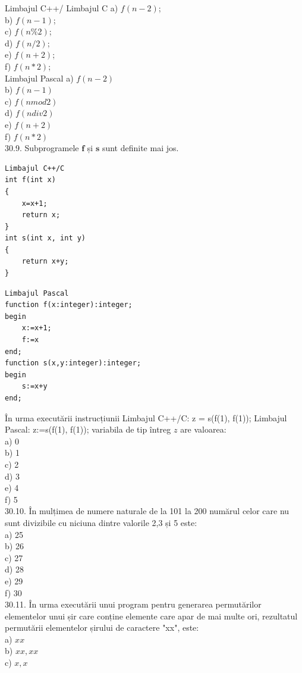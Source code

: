\begin{itemize}
Limbajul C++/ Limbajul C
a) $f(n-2)$;
\\
b) $f(n-1)$;
\\
c) $f(n \% 2)$;
\\
d) $f(n / 2)$;
\\
e) $f(n+2)$;
\\
f) $f(n * 2)$;
\\
Limbajul Pascal
a) $f(n-2)$
\\
b) $f(n-1)$
\\
c) $f(n mod 2)$
\\
d) $f(n div 2)$
\\
e) $f(n+2)$
\\
f) $f(n * 2)$
\\
30.9. Subprogramele $\mathbf{f}$ și $\mathbf{s}$ sunt definite mai jos.
\begin{verbatim}
Limbajul C++/C
int f(int x)
{
    x=x+1;
    return x;
}
int s(int x, int y)
{
    return x+y;
}
\end{verbatim}
\begin{verbatim}
Limbajul Pascal
function f(x:integer):integer;
begin
    x:=x+1;
    f:=x
end;
function s(x,y:integer):integer;
begin
    s:=x+y
end;
\end{verbatim}
În urma executării instrucțiunii
Limbajul C++/C: z = s(f(1), f(1));
Limbajul Pascal: z:=s(f(1), f(1));
variabila de tip întreg $z$ are valoarea:
\\
a) 0
\\
b) 1
\\
c) 2
\\
d) 3
\\
e) 4
\\
f) 5
\\
30.10. În mulțimea de numere naturale de la 101 la 200 numărul celor care nu sunt divizibile cu niciuna dintre valorile 2,3 și 5 este:
\\
a) 25
\\
b) 26
\\
c) 27
\\
d) 28
\\
e) 29
\\
f) 30
\\
30.11. În urma executării unui program pentru generarea permutărilor elementelor unui șir care conține elemente care apar de mai multe ori, rezultatul permutării elementelor șirului de caractere "xx", este:
\\
a) $xx$
\\
b) $xx, xx$
\\
c) $x, x$
\\

\end{itemize}
